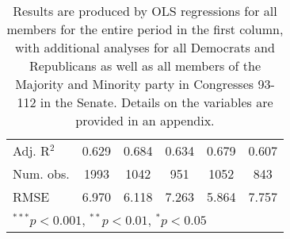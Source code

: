 \documentclass[12pt]{article}
\newcommand\fnote[1]{\captionsetup{font=small}\caption*{#1}}
\begin{document}
\begin{table}[H]
\begin{center}
\begin{tabular}{l c c c c c }
			Adj. R$^2$             & 0.629          & 0.684         & 0.634          & 0.679          & 0.607         \\
			Num. obs.              & 1993           & 1042          & 951            & 1052           & 843           \\
			RMSE                   & 6.970          & 6.118         & 7.263          & 5.864          & 7.757         \\
			\hline
			\multicolumn{6}{l}{\scriptsize{$^{***}p<0.001$, $^{**}p<0.01$, $^*p<0.05$}}
		\end{tabular}
		\fnote{Results are produced by OLS regressions for all members for the entire period in the first column, with additional analyses for all Democrats and Republicans as well as all members of the Majority and Minority party in Congresses 93-112 in the Senate. Details on the variables are provided in an appendix.}
	\end{center}
\end{table}
\end{document}
